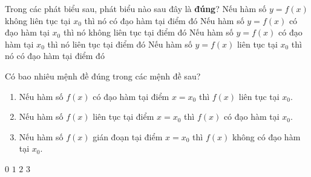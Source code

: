 \begin{ex}%
	Trong các phát biểu sau, phát biểu nào sau đây là  \textbf{đúng}?
	 \choice
		{Nếu hàm số $y=f(x)$ không  liên tục tại $x_0$ thì nó có đạo hàm tại điểm đó}
		{Nếu hàm số $y=f(x)$ có đạo hàm tại $x_0$ thì nó không liên tục tại  điểm đó}
		{\True Nếu hàm số $y=f(x)$ có đạo hàm tại $x_0$  thì nó liên tục tại điểm đó}
		{Nếu hàm số $y=f(x)$ liên tục tại $x_0$ thì nó có  đạo hàm tại điểm đó}
\end{ex}

\begin{ex}%
	Có bao nhiêu mệnh đề đúng trong  các mệnh đề sau?
	\begin{enumerate}[(1)]
		\item Nếu hàm số $f(x)$  có đạo hàm tại điểm $x = x_0$ thì $f(x)$ liên tục tại $x_0$.
		\item Nếu hàm số $f(x)$ liên tục tại điểm $x = x_0$ thì $f(x)$ có  đạo hàm tại $x_0$.
		\item  Nếu hàm số $f(x)$ gián đoạn tại điểm $x = x_0$ thì $f(x)$ không có đạo hàm tại $x_0$.
	\end{enumerate}
	\choice 
		{$0$} 
		 {$1$}
		{\True  $2$}
		 {$3$}
\end{ex}


